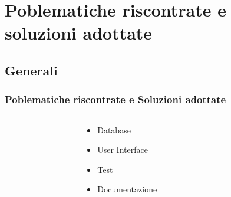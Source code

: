 \section{Poblematiche riscontrate e soluzioni adottate}
\subsection{Generali}

\begin{frame}
	\frametitle{Poblematiche riscontrate e Soluzioni adottate}
	
		
		\begin{columns}
			\begin{column}{0.2\textwidth}
				
			\end{column}
			
			\begin{column}{0.4\textwidth}
				\begin{itemize}
					\item Database
					\item User Interface
					\item Test
					\item Documentazione
				
				\end{itemize}
			\end{column}
			
			\begin{column}{0.2\textwidth}
				
			\end{column}
		\end{columns}
		
		
\end{frame}




